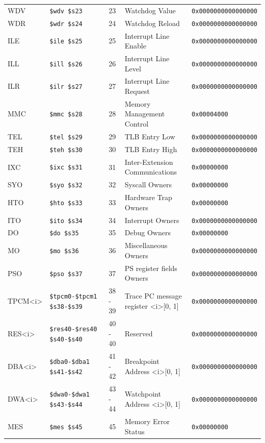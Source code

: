 {\begin{tabular}{|l|l|l|l|l|}
WDV & \verb|$wdv $s23| & 23 & Watchdog Value & \verb|0x0000000000000000| \\
WDR & \verb|$wdr $s24| & 24 & Watchdog Reload & \verb|0x0000000000000000| \\
ILE & \verb|$ile $s25| & 25 & Interrupt Line Enable & \verb|0x0000000000000000| \\
ILL & \verb|$ill $s26| & 26 & Interrupt Line Level & \verb|0x0000000000000000| \\
ILR & \verb|$ilr $s27| & 27 & Interrupt Line Request & \verb|0x0000000000000000| \\
MMC & \verb|$mmc $s28| & 28 & Memory Management Control & \verb|0x00004000| \\
TEL & \verb|$tel $s29| & 29 & TLB Entry Low & \verb|0x0000000000000000| \\
TEH & \verb|$teh $s30| & 30 & TLB Entry High & \verb|0x0000000000000000| \\
IXC & \verb|$ixc $s31| & 31 & Inter-Extension Communications & \verb|0x00000000| \\
SYO & \verb|$syo $s32| & 32 & Syscall Owners & \verb|0x00000000| \\
HTO & \verb|$hto $s33| & 33 & Hardware Trap Owners & \verb|0x00000000| \\
ITO & \verb|$ito $s34| & 34 & Interrupt Owners & \verb|0x0000000000000000| \\
DO & \verb|$do $s35| & 35 & Debug Owners & \verb|0x00000000| \\
MO & \verb|$mo $s36| & 36 & Miscellaneous Owners & \verb|0x0000000000000000| \\
PSO & \verb|$pso $s37| & 37 & PS register fields Owners & \verb|0x0000000000000000| \\
TPCM\textless i\textgreater & \verb|$tpcm0-$tpcm1 $s38-$s39| & 38 - 39 & Trace PC message register \textless i\textgreater [0, 1] & \verb|0x0000000000000000| \\
RES\textless i\textgreater & \verb|$res40-$res40 $s40-$s40| & 40 - 40 & Reserved & \verb|0x0000000000000000| \\
DBA\textless i\textgreater & \verb|$dba0-$dba1 $s41-$s42| & 41 - 42 & Breakpoint Address \textless i\textgreater [0, 1] & \verb|0x0000000000000000| \\
DWA\textless i\textgreater & \verb|$dwa0-$dwa1 $s43-$s44| & 43 - 44 & Watchpoint Address \textless i\textgreater [0, 1] & \verb|0x0000000000000000| \\
MES & \verb|$mes $s45| & 45 & Memory Error Status & \verb|0x00000000| \\

\end{tabular}}
